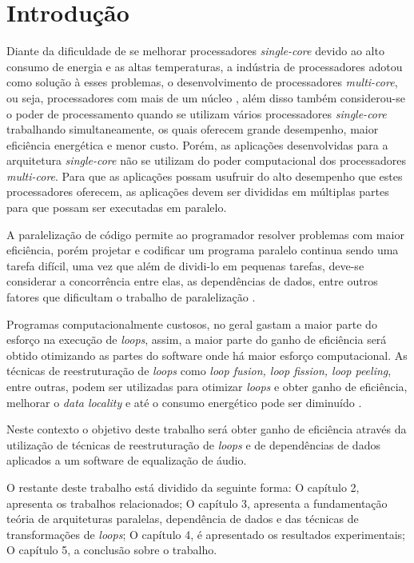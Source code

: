 \chapter{Introdução}

Diante da  dificuldade de se melhorar processadores \textit{single-core} devido 
ao alto consumo de energia e as altas temperaturas, a indústria de processadores 
adotou como solução à esses problemas, o desenvolvimento de processadores 
\textit{multi-core}, ou seja, processadores com mais de um núcleo \cite{aapc}, 
além disso também considerou-se o poder de processamento 
quando se utilizam vários processadores \textit{single-core} trabalhando 
simultaneamente, os quais oferecem grande desempenho, maior eficiência energética 
e menor custo.
Porém, as aplicações desenvolvidas para a arquitetura \textit{single-core} não 
se utilizam do poder computacional dos processadores \textit{multi-core}.
Para que as aplicações possam usufruir do alto desempenho que estes processadores 
oferecem, as aplicações devem ser divididas em múltiplas partes para que possam 
ser executadas em paralelo.

A paralelização de código permite ao programador resolver problemas com maior 
eficiência, porém projetar e codificar um programa paralelo continua sendo uma 
tarefa difícil, uma vez que além de dividi-lo em pequenas tarefas, deve-se 
considerar a concorrência entre elas, as dependências de dados, entre outros 
fatores que dificultam o trabalho de paralelização \cite{aipp}.

Programas computacionalmente custosos, no geral gastam a maior parte do esforço 
na execução de \textit{loops}, assim, a maior parte do ganho de eficiência será
obtido otimizando as partes do software onde há maior esforço computacional.
As técnicas de reestruturação de \textit{loops} como \textit{loop 
fusion, loop fission, loop peeling}, entre outras, podem ser utilizadas para
otimizar \textit{loops} e obter ganho de eficiência, melhorar o \textit{data
locality} e até o consumo energético pode ser diminuído \cite{Liu:2004}.

Neste contexto o objetivo deste trabalho será obter ganho de eficiência através da 
utilização de técnicas de reestruturação de \textit{loops} e de dependências de 
dados aplicados a um software de equalização de áudio.

O restante deste trabalho está dividido da seguinte forma: O capítulo 2,
  apresenta os trabalhos relacionados; O capítulo 3,
  apresenta a fundamentação teória de arquiteturas paralelas, dependência de
  dados e das técnicas de transformações de \textit{loops}; O capítulo 4, é  
  apresentado os resultados experimentais; O capítulo 5, a conclusão sobre o
  trabalho.
